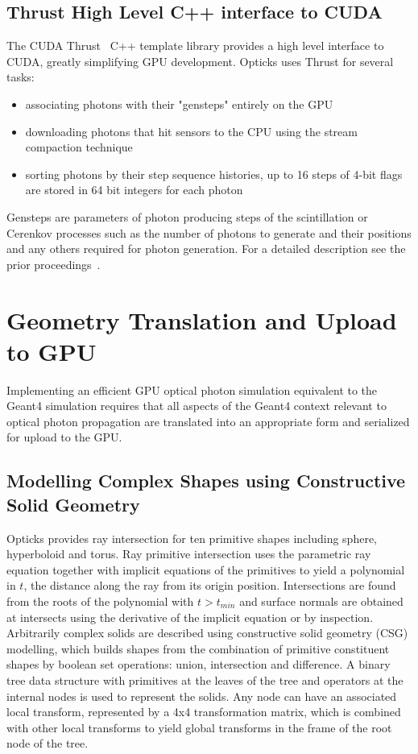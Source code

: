 \documentclass{webofc}
\begin{document}
\subsection{Thrust High Level C++ interface to CUDA}
%
The CUDA Thrust~\cite{thrust} C++ template library provides a high level interface to CUDA, 
greatly simplifying GPU development. Opticks uses Thrust for several tasks:
%
\begin{itemize}
\item associating photons with their "gensteps" entirely on the GPU
\item downloading photons that hit sensors to the CPU using the stream compaction technique
\item sorting photons by their step sequence histories, up to 16 steps of 4-bit flags are stored in 64 bit integers for each photon
\end{itemize} 
%
Gensteps are parameters of photon producing steps of the scintillation or Cerenkov processes such as
the number of photons to generate and their positions and any others required for photon generation.
For a detailed description see the prior proceedings~\cite{chep2016}.
%
\section{Geometry Translation and Upload to GPU}
\label{geometry}
%
Implementing an efficient GPU optical photon simulation equivalent to the Geant4 simulation 
requires that all aspects of the Geant4 context relevant to optical photon propagation are 
translated into an appropriate form and serialized for upload to the GPU.
%
\subsection{Modelling Complex Shapes using Constructive Solid Geometry}
%
Opticks provides ray intersection for ten primitive shapes including sphere, hyperboloid and torus.
Ray primitive intersection uses the parametric ray equation together with implicit equations 
of the primitives to yield a polynomial in $t$, the distance along the ray from its origin position. 
Intersections are found from the roots of the polynomial with $t > t_{min}$ and surface normals are obtained at intersects
using the derivative of the implicit equation or by inspection.
%
Arbitrarily complex solids are described using constructive solid geometry (CSG) modelling, 
which builds shapes from the combination of primitive constituent shapes by boolean set operations: union, intersection and difference.
A binary tree data structure with primitives at the leaves of the tree and operators at the internal nodes is used
to represent the solids. Any node can have an associated local transform, represented by a 4x4 transformation matrix, which 
is combined with other local transforms to yield global transforms in the frame of the root node of the tree.
%
\end{document}
